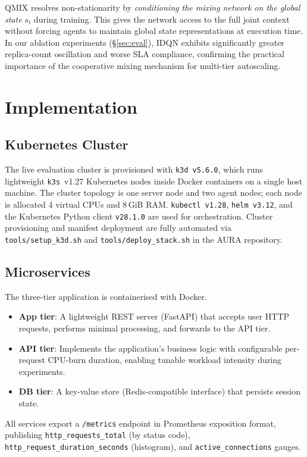 \documentclass[conference]{IEEEtran}
\begin{document}
QMIX resolves non-stationarity by \emph{conditioning the mixing
network on the global state} $s_t$ during training. This gives the
network access to the full joint context without forcing agents to
maintain global state representations at execution time. In our
ablation experiments (\S\ref{sec:eval}), IDQN exhibits
significantly greater replica-count oscillation and worse SLA
compliance, confirming the practical importance of the cooperative
mixing mechanism for multi-tier autoscaling.

\section{Implementation}
\label{sec:impl}

\subsection{Kubernetes Cluster}

The live evaluation cluster is provisioned with
\texttt{k3d~v5.6.0}, which runs lightweight
\texttt{k3s}~v1.27 Kubernetes nodes inside Docker containers on a
single host machine. The cluster topology is one server node and
two agent nodes; each node is allocated 4 virtual CPUs and 8\,GiB
RAM. \texttt{kubectl~v1.28}, \texttt{helm~v3.12}, and the
Kubernetes Python client \texttt{v28.1.0} are used for
orchestration. Cluster provisioning and manifest deployment are
fully automated via \texttt{tools/setup\_k3d.sh} and
\texttt{tools/deploy\_stack.sh} in the AURA repository.

\subsection{Microservices}

The three-tier application is containerised with Docker.
\begin{itemize}
  \item \textbf{App tier}: A lightweight REST server (FastAPI) that
        accepts user HTTP requests, performs minimal processing, and
        forwards to the API tier.
  \item \textbf{API tier}: Implements the application's business
        logic with configurable per-request CPU-burn duration,
        enabling tunable workload intensity during experiments.
  \item \textbf{DB tier}: A key-value store (Redis-compatible
        interface) that persists session state.
\end{itemize}
All services export a \texttt{/metrics} endpoint in Prometheus
exposition format, publishing \texttt{http\_requests\_total} (by
status code), \texttt{http\_request\_duration\_seconds} (histogram),
and \texttt{active\_connections} gauges.
\end{document}
